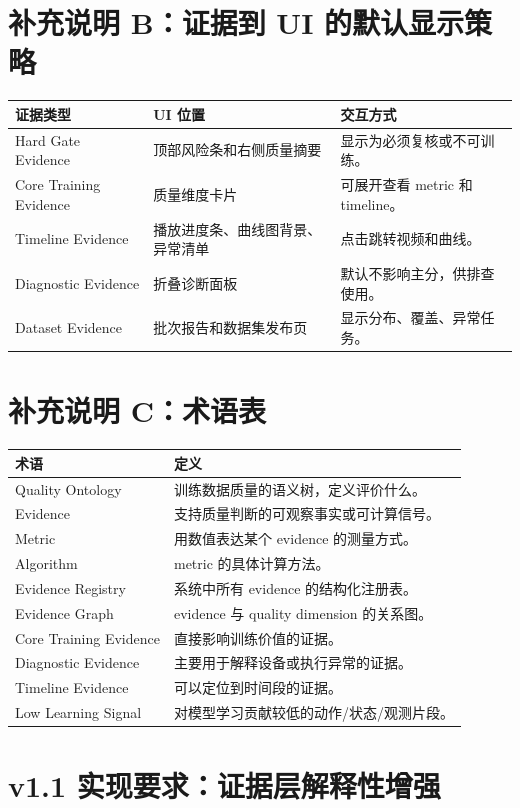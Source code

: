 \documentclass[UTF8,zihao=-4,oneside,openany]{ctexrep}
\begin{document}
\section{补充说明 B：证据到 UI 的默认显示策略}

\begin{longtable}{L{3.5cm} L{4.5cm} L{5.5cm}}
\toprule
证据类型 & UI 位置 & 交互方式 \\
\midrule
Hard Gate Evidence & 顶部风险条和右侧质量摘要 & 显示为必须复核或不可训练。 \\
Core Training Evidence & 质量维度卡片 & 可展开查看 metric 和 timeline。 \\
Timeline Evidence & 播放进度条、曲线图背景、异常清单 & 点击跳转视频和曲线。 \\
Diagnostic Evidence & 折叠诊断面板 & 默认不影响主分，供排查使用。 \\
Dataset Evidence & 批次报告和数据集发布页 & 显示分布、覆盖、异常任务。 \\
\bottomrule
\end{longtable}

\section{补充说明 C：术语表}

\begin{longtable}{L{3.2cm} L{10.5cm}}
\toprule
术语 & 定义 \\
\midrule
Quality Ontology & 训练数据质量的语义树，定义评价什么。 \\
Evidence & 支持质量判断的可观察事实或可计算信号。 \\
Metric & 用数值表达某个 evidence 的测量方式。 \\
Algorithm & metric 的具体计算方法。 \\
Evidence Registry & 系统中所有 evidence 的结构化注册表。 \\
Evidence Graph & evidence 与 quality dimension 的关系图。 \\
Core Training Evidence & 直接影响训练价值的证据。 \\
Diagnostic Evidence & 主要用于解释设备或执行异常的证据。 \\
Timeline Evidence & 可以定位到时间段的证据。 \\
Low Learning Signal & 对模型学习贡献较低的动作/状态/观测片段。 \\
\bottomrule
\end{longtable}


\newpage
\section*{v1.1 实现要求：证据层解释性增强}
\end{document}
